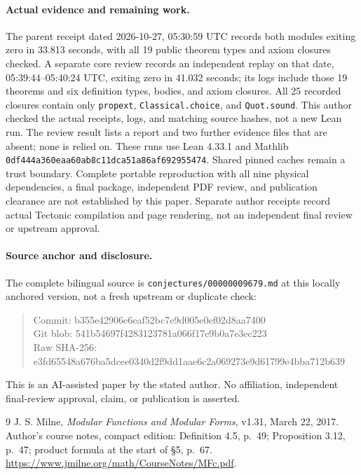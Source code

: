\documentclass[11pt]{article}
\begin{document}
\paragraph{Actual evidence and remaining work.}
The parent receipt dated 2026-10-27, 05:30:59 UTC records both modules
exiting zero in 33.813 seconds, with all 19 public theorem types and axiom
closures checked. A separate core review records an independent replay
on that date, 05:39:44--05:40:24 UTC, exiting zero in 41.032 seconds;
its logs include those 19 theorems and six definition types, bodies, and
axiom closures. All 25 recorded closures contain only \texttt{propext},
\texttt{Classical.choice}, and \texttt{Quot.sound}. This author checked
the actual receipts, logs, and matching source hashes, not a new Lean run.
The review result lists a report and two further evidence files that are
absent; none is relied on. These runs use Lean 4.33.1 and Mathlib
\texttt{\small 0df444a360eaa60ab8c11dca51a86af692955474}.
Shared pinned caches remain a trust boundary. Complete portable
reproduction with all nine physical dependencies, a final package,
independent PDF review, and publication clearance are not established by
this paper. Separate author receipts record actual Tectonic compilation
and page rendering, not an independent final review or upstream approval.
\paragraph{Source anchor and disclosure.}
The complete bilingual source is \texttt{conjectures/00000009679.md} at
this locally anchored version, not a fresh upstream or duplicate check:
\begin{quote}\footnotesize\ttfamily
Commit: b355e42906e6eaf52bc7e9d005e0ef02d8aa7400\\
Git blob: 541b54697f4283123781a066f17e9b0a7e3ec223\\
Raw SHA-256:\\
e3fd65548a676ba5dcee0340d2f9dd1aae6c2a069273e9d61799e4bba712b639
\end{quote}
This is an AI-assisted paper by the stated author. No affiliation,
independent final-review approval, claim, or publication is asserted.
\begin{thebibliography}{9}
 J. S. Milne, \emph{Modular Functions and Modular Forms},
v1.31, March 22, 2017. Author's course notes, compact edition:
Definition 4.5, p.~49; Proposition 3.12, p.~47; product formula at the
start of \S5, p.~67. \url{https://www.jmilne.org/math/CourseNotes/MFc.pdf}.
\end{thebibliography}
\end{document}

